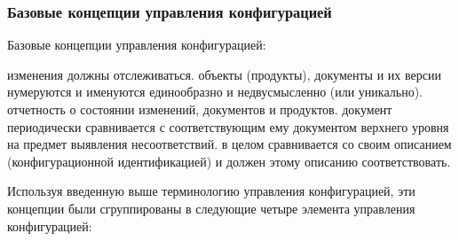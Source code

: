 \documentclass{../industrial-development}
\begin{document}
\begin{frame} \frametitle{Базовые концепции управления конфигурацией}
  \begin{block}{Базовые концепции управления конфигурацией:}
  \begin{itemize}
 изменения должны отслеживаться.
 объекты (продукты), документы и их версии нумеруются и именуются единообразно и недвусмысленно (или уникально).
 отчетность о состоянии изменений, документов и продуктов.
 документ периодически сравнивается с соответствующим ему документом верхнего уровня на предмет выявления несоответствий.
 в целом сравнивается со своим описанием (конфигурационной идентификацией) и должен этому описанию соответствовать.
  \end{itemize}
	\end{block}
\end{frame}

\lecturenotes
Используя введенную выше терминологию управления конфигурацией, эти концепции были сгруппированы в следующие четыре элемента управления конфигурацией:
	
\end{document}
